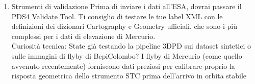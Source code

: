 \documentclass[a4paper,14pt]{article}
\begin{document}
\begin{enumerate}
\begin{itemize}
(es. calcolo delle pendenze o analisi dei crateri polari per la ricerca di ghiaccio d'acqua).
\end{itemize}
\item Strumenti di validazione
Prima di inviare i dati all'ESA, dovrai passare il PDS4 Validate Tool. Ti consiglio di testare le tue label XML con le definizioni dei dizionari Cartography e Geometry ufficiali, che sono i più complessi per i dati di elevazione di Mercurio.\\
Curiosità tecnica: State già testando la pipeline 3DPD sui dataset sintetici o sulle immagini di flyby di BepiColombo? I flyby di Mercurio (come quello avvenuto recentemente) forniscono dati preziosi per calibrare proprio la risposta geometrica dello strumento STC prima dell'arrivo in orbita stabile
\end{enumerate}
\end{document}
